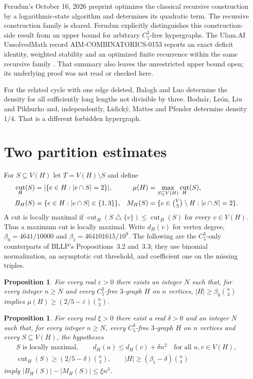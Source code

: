 \documentclass[11pt]{article}
\newtheorem{proposition}[theorem]{Proposition}
\DeclareMathOperator{\cut}{cut}
\newcommand{\Cfive}{C_5^3}
\begin{document}
Ferudun's October 16, 2026 preprint \cite[Theorems~1--3 and \S5]{Ferudun}
optimizes the classical recursive construction by a logarithmic-state
algorithm and determines its quadratic term. The recursive construction
family is shared. Ferudun explicitly distinguishes this construction-side
result from an upper bound for arbitrary $\Cfive$-free hypergraphs.
The Ulam.AI UnsolvedMath record AIM-COMBINATORICS-0153 reports an exact
deficit identity, weighted stability and an optimized finite recurrence
within the same recursive family \cite{UnsolvedMath}. That summary also
leaves the unrestricted upper bound open; its underlying proof was not
read or checked here.

For the related cycle with one edge deleted, Balogh and Luo
\cite{BL} determine the density for all sufficiently long lengths
not divisible by three. Bodn\'ar, Le\'on, Liu and
Pikhurko \cite[Theorem~1.1]{BLLPminus} and, independently, Lidick\'y,
Mattes and Pfender \cite[Abstract]{LMP} determine density $1/4$.
That is a different forbidden hypergraph.

\section{Two partition estimates}
For $S\subseteq V(H)$ let $T=V(H)\setminus S$ and define
\begin{align*}
 \cut_H(S)&=|\{e\in H:|e\cap S|=2\}|,&
 \mu(H)&=\max_{S\subseteq V(H)}\cut_H(S),\\
 B_H(S)&=\{e\in H:|e\cap S|\in\{1,3\}\},&
 M_H(S)&=\{e\in\tbinom V3\setminus H:|e\cap S|=2\}.
\end{align*}
A cut is locally maximal if
$\cut_H(S\mathbin\triangle\{v\})\le\cut_H(S)$ for every $v\in V(H)$.
Thus a maximum cut is locally maximal. Write $d_H(v)$ for vertex degree,
$\beta_0=4641/10000$ and $\beta_1=464101615/10^9$.
The following are the $\Cfive$-only counterparts of BLLP's
Propositions~3.2 and~3.3; they use binomial normalization, an asymptotic
cut threshold, and coefficient one on the missing triples.

\begin{proposition}\label{prop:cut}
For every real $\varepsilon>0$ there exists an integer $N$ such that,
for every integer $n\ge N$ and every $\Cfive$-free $3$-graph $H$ on $n$
vertices, $|H|\ge\beta_0\binom n3$ implies
$\mu(H)\ge(2/5-\varepsilon)\binom n3$.
\end{proposition}

\begin{proposition}\label{prop:bad}
For every real $\xi>0$ there exist a real $\delta>0$ and an integer $N$
such that, for every integer $n\ge N$, every $\Cfive$-free $3$-graph
$H$ on $n$ vertices and every $S\subseteq V(H)$, the hypotheses
\begin{gather*}
 S\text{ is locally maximal},\qquad
 d_H(u)\le d_H(v)+\delta n^2\quad\text{for all }u,v\in V(H),\\
 \cut_H(S)\ge(2/5-\delta)\binom n3,\qquad
 |H|\ge(\beta_1-\delta)\binom n3
\end{gather*}
imply $|B_H(S)|-|M_H(S)|\le\xi n^3$.
\end{proposition}
\end{document}
